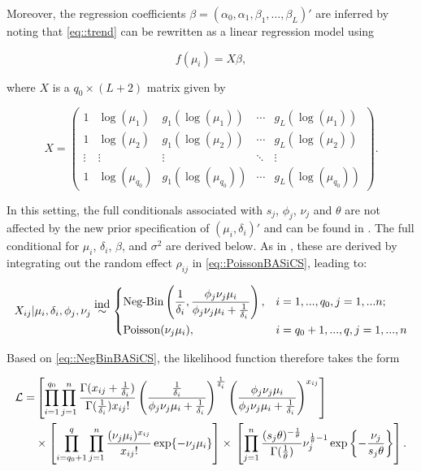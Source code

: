 Moreover, the regression coefficients $\beta = (\alpha_0, \alpha_1, \beta_1, \ldots, \beta_L)'$ are inferred by noting that \ref{eq::trend} can be rewritten as a linear regression model using 

\begin{equation} \label{eq::trend2} f(\mu_i) = X \beta, \end{equation} 

where $X$ is a $q_0 \times (L+2)$ matrix given by 

\begin{equation} \label{eq::X} X = \left( \begin{array}{ccccc}
1 & \log(\mu_1) & g_1(\log(\mu_1)) & \cdots & g_L(\log(\mu_1)) \\
1 & \log(\mu_2) & g_1(\log(\mu_2)) & \cdots & g_L(\log(\mu_2)) \\
\vdots & \vdots & \vdots & \ddots & \vdots  \\
1 & \log(\mu_{q_0}) & g_1(\log(\mu_{q_0})) & \cdots & g_L(\log(\mu_{q_0}))
\end{array}\right).\end{equation}

In this setting, the full conditionals associated with $s_j$, $\phi_j$, $\nu_j$ and $\theta$ are not affected by the new prior specification of $(\mu_i, \delta_i)'$ and can be found in \cite{Vallejos2016}. The full conditional for $\mu_i$, $\delta_i$, $\beta$, and $\sigma^2$ are derived below. As in \cite{Vallejos2015BASiCS}, these are derived by integrating out the random effect $\rho_{ij}$ in \ref{eq::PoissonBASiCS}, leading to:

\begin{equation} \label{eq::NegBinBASiCS}
 X_{ij}|\mu_i,\delta_i,\phi_j,\nu_j \stackrel{\mbox{ind}}{\sim}
 \left\lbrace
  \begin{aligned}
    &\textnormal{Neg-Bin}\left(\frac{1}{\delta_i},\frac{\phi_j\nu_j\mu_i}{\phi_j\nu_j\mu_i+\frac{1}{\delta_i}}\right), && i=1,...,q_0,j=1,...n;  \\ 
    &\textnormal{Poisson}(\nu_j\mu_i), && i=q_0+1,...,q,j=1,...,n        
  \end{aligned}
\right.
\end{equation}

Based on \ref{eq::NegBinBASiCS}, the likelihood function therefore takes the form

\begin{align} \label{eq::loglik}
\mathcal{L} = & \left[\prod_{i=1}^{q_0}\prod_{j=1}^n\frac{\Gamma(x_{ij}+\frac{1}{\delta_i})}{\Gamma(\frac{1}{\delta_i})x_{ij}!}\left(\frac{\frac{1}{\delta_i}}{\phi_j\nu_j\mu_i+\frac{1}{\delta_i}}\right)^\frac{1}{\delta_i}\left(\frac{\phi_j\nu_j\mu_i}{\phi_j\nu_j\mu_i+\frac{1}{\delta_i}}\right)^{x_{ij}}\right] \nonumber\\ 
&\times\left[\prod_{i=q_0+1}^{q}\prod_{j=1}^n\frac{(\nu_j\mu_i)^{x_{ij}}}{x_{ij}!}\exp\lbrace-\nu_j\mu_i\rbrace\right]\times{}\left[\prod_{j=1}^n\frac{(s_j\theta)^{-\frac{1}{\theta}}}{\Gamma(\frac{1}{\theta})}\nu_j^{\frac{1}{\theta}-1}\exp\left\lbrace-\frac{\nu_j}{s_j\theta}\right\rbrace\right].
\end{align} 

